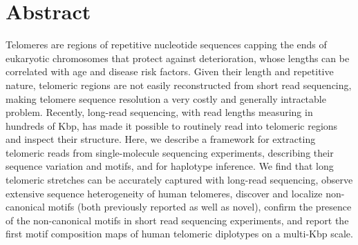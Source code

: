 \documentclass{article}
\begin{document}
\section*{Abstract} 
Telomeres are regions of repetitive nucleotide sequences capping the ends of eukaryotic chromosomes that protect against deterioration, whose lengths can be correlated with age and disease risk factors.
Given their length and repetitive nature, telomeric regions are not easily reconstructed from short read sequencing, making telomere sequence resolution a very costly and generally intractable problem.
Recently, long-read sequencing, with read lengths measuring in hundreds of Kbp, has made it possible to routinely read into telomeric regions and inspect their structure.
Here, we describe a framework for extracting telomeric reads from single-molecule sequencing experiments, describing their sequence variation and motifs, and for haplotype inference.
We find that
long telomeric stretches can be accurately captured with long-read sequencing,
observe extensive sequence heterogeneity of human telomeres,
discover and localize non-canonical motifs (both previously reported as well as novel),
confirm the presence of the non-canonical motifs in short read sequencing experiments,
and report the first motif composition maps of human telomeric diplotypes on a multi-Kbp scale.

\pagebreak
\doublespacing
\end{document}

